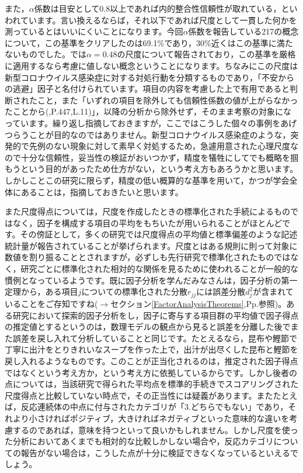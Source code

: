 \documentclass{ltjsbook}
\begin{document}
また，$\alpha$係数は目安として0.8以上であれば内的整合性信頼性が取れている，といわれています。言い換えるならば，それ以下であれば尺度として一貫した何かを測っているとはいいにくいことになります。今回$\alpha$係数を報告している217の概念について，この基準をクリアしたのは69.1\%であり，30\%近くはこの基準に満たないものでした。\citet{Koiwa202192}では$\alpha=0.48$の尺度について報告されており，この基準を厳格に適用するなら考慮に値しない概念ということになります。ちなみにこの尺度は新型コロナウイルス感染症に対する対処行動を分類するものであり，「不安からの逃避」因子と名付けられています。項目の内容を考慮した上で有用であると判断されたこと，また「いずれの項目を除外しても信頼性係数の値が上がらなかったことから(\citep{Koiwa202192},P.447,L.11)」，以降の分析から除外せず，そのまま考察の対象になっています。繰り返し指摘しておきますが，ここではこうした個々の事例をあげつらうことが目的なのではありません。新型コロナウイルス感染症のような，突発的で先例のない現象に対して素早く対処するため，急遽用意された心理尺度なので十分な信頼性，妥当性の検証がおいつかず，精度を犠牲にしてでも概略を掴もうという目的があったため仕方がない，という考え方もあろうかと思います。しかしことこの研究に限らず，精度の低い概算的な基準を用いて，かつが学会全体にあることは，指摘しておきたいと思います。

また尺度得点については，尺度を作成したときの標準化された手続によるものではなく，因子を構成する項目の平均をもちいたが用いられることがほとんどです。その傍証として，多くの研究では尺度得点の平均値と標準偏差のような記述統計量が報告されていることが挙げられます。尺度とはある規則に則って対象に数値を割り振ることとされますが，必ずしも先行研究で標準化されたものではなく，研究ごとに標準化された相対的な関係を見るために使われることが一般的な慣例となっているようです。既に因子分析を学んだみなさんは，因子分析の第一定理から，ある項目$j$についての標準化された分散$r_{jj}$には誤差分散$d_j^2$が含まれていることをご存知ですね($\to$セクション\ref{FactorAnalysisTheorems},Pp.\pageref{FactorAnalysisTheorems}参照)。ある研究において探索的因子分析をし，因子に寄与する項目群の平均値で因子得点の推定値とするというのは，数理モデルの観点から見ると誤差を分離した後でまた誤差を戻し入れて分析していることと同じです。たとえるなら，昆布や鰹節で丁寧に出汁をとりきれいなスープを作った上で，出汁が出尽くした昆布と鰹節を戻し入れるようなものです。このことが正当化されるのは，推定された因子得点ではなくという考え方か，という考え方に依拠しているからです。しかし後者の点については，当該研究で得られた平均点を標準的手続きでスコアリングされた尺度得点と比較していない時点で，その正当性には疑義があります。またたとえば，反応連続体の中点に付与されたカテゴリが「3.どちらでもない」であり，それより小さければポジティブ，大きければネガティブといった意味的な違いを考慮するのであれば，意味を持つといって良いかもしれません。しかし尺度を使った分析においてあくまでも相対的な比較しかしない場合や，反応カテゴリについての報告がない場合は，こうした点が十分に検証できなくなっているといえるでしょう。
\end{document}
